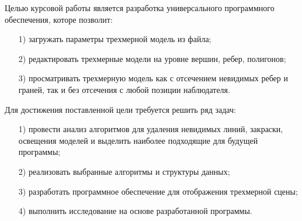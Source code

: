 
Целью курсовой работы является разработка универсального программного обеспечения, которе позволит: 
\begin{enumerate}
	\item[1)] загружать параметры трехмерной модель из файла;
	\item[2)] редактировать трехмерные модели на уровне вершин, ребер, полигонов; 
	\item[3)] просматривать трехмерную модель как с отсечением невидимых ребер и граней, так и без отсечения с любой позиции наблюдателя.
\end{enumerate}

Для достижения поставленной цели требуется решить ряд задач:
\begin{enumerate}
	\item[1)] провести анализ алгоритмов для удаления невидимых линий, закраски, освещения моделей и выделить наиболее подходящие для будущей программы;
	\item[2)] реализовать выбранные алгоритмы и структуры данных;
	\item[3)] разработать программное обеспечение для отображения трехмерной
	сцены;
	\item[4)] выполнить исследование на основе разработанной программы.
\end{enumerate}

\newpage
